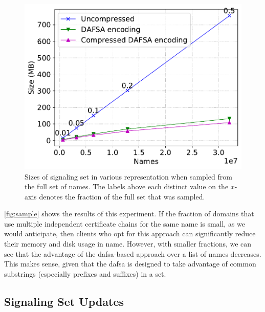 \begin{figure}[t]
  \centering
  \includegraphics[width=\linewidth]{fig/sample}
  \caption{Sizes of signaling set in various representation when sampled from
  the full set of names. The labels above each distinct value on the $x$-axis
  denotes the fraction of the full set that was sampled.}
  \label{fig:sample}
\end{figure}

\autoref{fig:sample} shows the results of this experiment. If the fraction of
domains that use multiple independent certificate chains for the same name is
small, as we would anticipate, then clients who opt for this approach can
significantly reduce their memory and disk usage in \ac{name}. However, with
smaller fractions, we can see that the advantage of the \ac{dafsa}-based
approach over a list of names decreases. This makes sense, given that the
\ac{dafsa} is designed to take advantage of common substrings (especially
prefixes and suffixes) in a set.

\subsection{Signaling Set Updates}
\label{sec:evaluation:updates}

